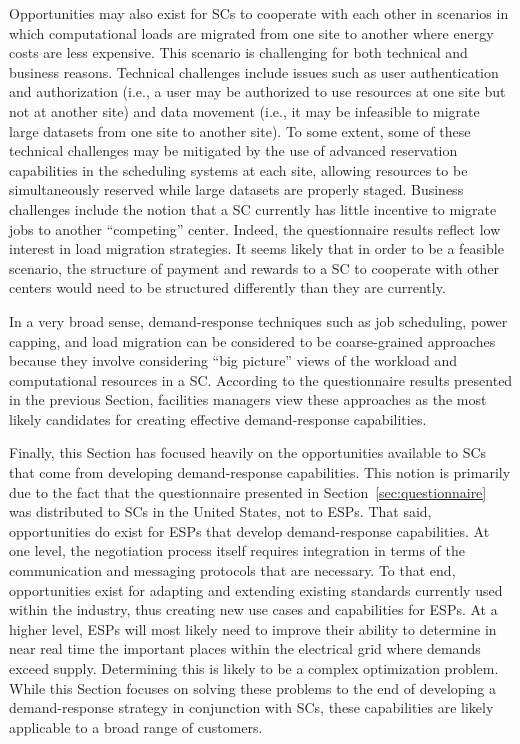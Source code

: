 Opportunities may also exist for SCs to cooperate
with each other in scenarios in which computational loads are migrated
from one site to another where energy costs are less expensive. This
scenario is challenging for both technical and business reasons.
Technical challenges include issues such as user authentication and
authorization (i.e., a user may be authorized to use resources at one
site but not at another site) and data movement (i.e., it may be
infeasible to migrate large datasets from one site to another site).
To some extent, some of these technical challenges may be mitigated by
the use of advanced reservation capabilities in the scheduling systems
at each site, allowing resources to be simultaneously reserved while
large datasets are properly staged. Business challenges include the
notion that a SC currently has little incentive to
migrate jobs to another ``competing'' center. Indeed, the
questionnaire results reflect low interest in load migration
strategies. It seems likely that in order to be a feasible scenario,
the structure of payment and rewards to a SC to
cooperate with other centers would need to be structured differently
than they are currently.

In a very broad sense, demand-response techniques such as job
scheduling, power capping, and load migration can be considered to
be coarse-grained approaches because they involve considering ``big
picture'' views of the workload and computational resources in a
SC. According to the questionnaire results
presented in the previous Section, facilities managers view these
approaches as the most likely candidates for creating effective
demand-response capabilities.

Finally, this Section has focused heavily on the opportunities
available to SCs that come from developing
demand-response capabilities. This notion is primarily due to the
fact that the questionnaire presented in Section~\ref{sec:questionnaire}
was distributed to SCs in the United States, not to
ESPs. That said, opportunities do exist for
ESPs that develop demand-response
capabilities. At one level, the negotiation process itself requires
integration in terms of the communication and messaging protocols that
are necessary. To that end, opportunities exist for adapting and
extending existing standards currently used within the industry, thus
creating new use cases and capabilities for ESPs. At a higher level, ESPs will most
likely need to improve their ability to determine in near real time
the important places within the electrical grid where demands exceed
supply. Determining this is likely to be a complex optimization
problem. While this Section focuses on solving these problems to the
end of developing a demand-response strategy in conjunction with
SCs, these capabilities are likely applicable to a
broad range of customers.
